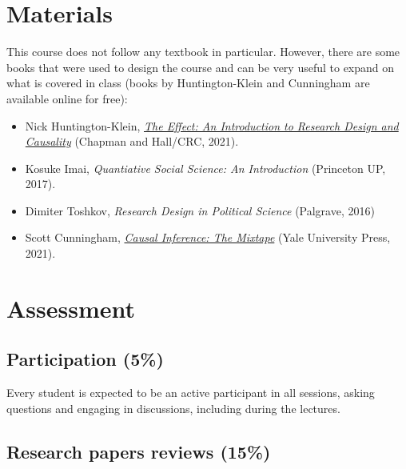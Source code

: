 \documentclass[12pt, a4paper]{article}
\begin{document}
\section{Materials}

This course does not follow any textbook in particular.
However, there are some books that were used to design the course and can be very useful to expand on what is covered in class (books by Huntington-Klein and Cunningham are available online for free):

\begin{itemize}
\setlength\itemsep{-5pt}
  \item Nick Huntington-Klein, \href{https://theeffectbook.net/}{\textit{The Effect: An Introduction to Research Design and Causality}} (Chapman and Hall/CRC, 2021).
  \item Kosuke Imai, \textit{Quantiative Social Science: An Introduction} (Princeton UP, 2017).
  \item Dimiter Toshkov, \textit{Research Design in Political Science} (Palgrave, 2016)
  \item Scott Cunningham, \href{https://mixtape.scunning.com/}{\textit{Causal Inference: The Mixtape}} (Yale University Press, 2021).
\end{itemize}


\section{Assessment}


\subsection*{Participation (5\%)}

Every student is expected to be an active participant in all sessions, asking questions and engaging in discussions, including during the lectures.

\subsection*{Research papers reviews (15\%)}
\end{document}

